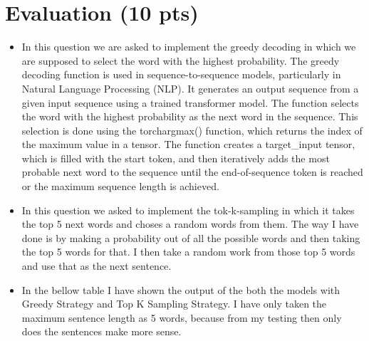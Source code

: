 \documentclass[a4paper]{article}
\begin{document}
\section{Evaluation (10 pts)}
\begin{itemize}
    \item In this question we are asked to implement the greedy decoding in which we are supposed to select the word with the highest probability. The greedy decoding function is used in sequence-to-sequence models, particularly in Natural Language Processing (NLP). It generates an output sequence from a given input sequence using a trained transformer model. The function selects the word with the highest probability as the next word in the sequence. This selection is done using the torchargmax() function, which returns the index of the maximum value in a tensor. The function creates a target\_input tensor, which is filled with the start token, and then iteratively adds the most probable next word to the sequence until the end-of-sequence token is reached or the maximum sequence length is achieved.
    \item In this question we asked to implement the tok-k-sampling in which it takes the top 5 next words and choses a random words from them. The way I have done is by making a probability out of all the possible words and then taking the top 5 words for that. I then take a random work from those top 5 words and use that as the next sentence.
    \item In the bellow table I have shown the output of the both the models with Greedy Strategy and Top K Sampling Strategy. I have only taken the maximum sentence length as 5 words, because from my testing then only does the sentences make more sense.


\end{itemize}
\end{document}
